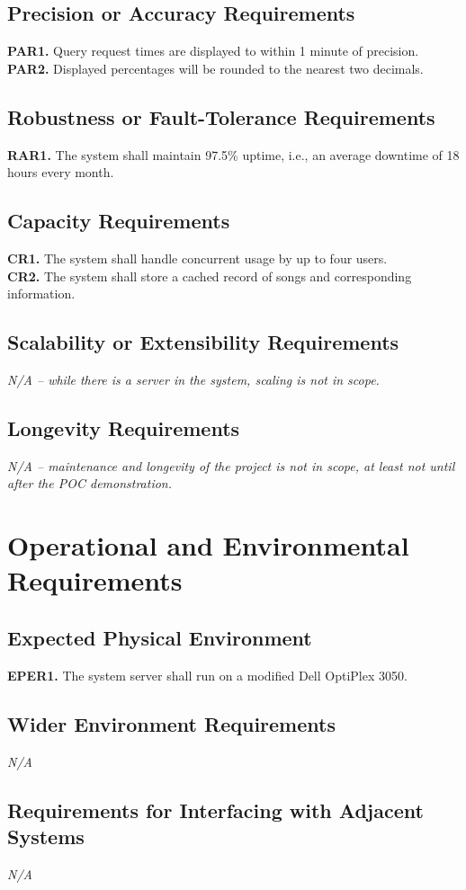 \documentclass[12pt]{article}
\begin{document}
\subsection{Precision or Accuracy Requirements}
\textbf{PAR1.} Query request times are displayed to within 1 minute of precision. \\
\textbf{PAR2.} Displayed percentages will be rounded to the nearest two decimals.
\subsection{Robustness or Fault-Tolerance Requirements}
\textbf{RAR1.} The system shall maintain 97.5\% uptime, i.e., an average downtime of 18 hours every month.
\subsection{Capacity Requirements}
\textbf{CR1.} The system shall handle concurrent usage by up to four users. \\
\textbf{CR2.} The system shall store a cached record of songs and corresponding information.
\subsection{Scalability or Extensibility Requirements}
\emph{N/A -- while there is a server in the system, scaling is not in scope.}
\subsection{Longevity Requirements}
\emph{N/A -- maintenance and longevity of the project is not in scope, at least not until after the POC demonstration.}
\section{Operational and Environmental Requirements}
\subsection{Expected Physical Environment}
\textbf{EPER1.} The system server shall run on a modified Dell OptiPlex 3050. \\
\subsection{Wider Environment Requirements}
\emph{N/A}
\subsection{Requirements for Interfacing with Adjacent Systems}
\emph{N/A}
\end{document}
